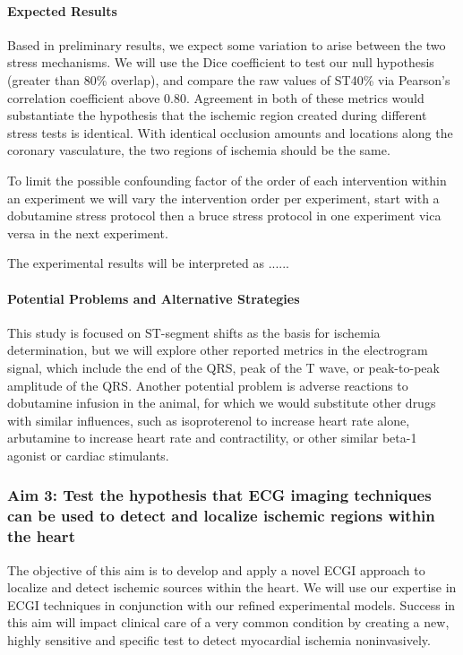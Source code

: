 \paragraph{Expected Results} Based in preliminary results, we expect some
variation to arise between the two stress mechanisms.  We will use the Dice
coefficient to test our null hypothesis (greater than 80\% overlap), and
compare the raw values of ST40\% via Pearson's correlation
coefficient above 0.80. Agreement in both of these metrics would
substantiate the hypothesis that the ischemic region created during
different stress tests is identical. With identical occlusion amounts and
locations along the coronary vasculature, the two regions of ischemia
should be the same. 

To limit the possible confounding factor of the order of each intervention within an experiment we will vary the intervention order per experiment, \ie{} start with a dobutamine stress protocol then a bruce stress protocol in one experiment vica versa in the next experiment. 

The experimental results will be interpreted as ...... 


\paragraph{Potential Problems and Alternative Strategies} This study is
focused on ST-segment shifts as the basis for ischemia determination, but
we will explore other reported metrics in the electrogram signal, which
include the end of the QRS, peak of the T wave, or peak-to-peak amplitude
of the QRS. Another potential problem is adverse reactions to dobutamine
infusion in the animal, for which we would substitute other drugs with
similar influences, such as isoproterenol to increase heart rate alone,
arbutamine to increase heart rate and contractility, or other similar
beta-1 agonist or cardiac stimulants.

\subsubsection{Aim 3: Test the hypothesis that ECG imaging techniques can be used to detect and localize ischemic regions within the heart}

The objective of this aim is to develop and apply a novel ECGI approach to
localize and detect ischemic sources within the heart. We will use our
expertise in ECGI techniques in conjunction with our refined experimental
models. Success in this aim will impact clinical care of a very common
condition by creating a new, highly sensitive and specific test to detect
myocardial ischemia noninvasively.

